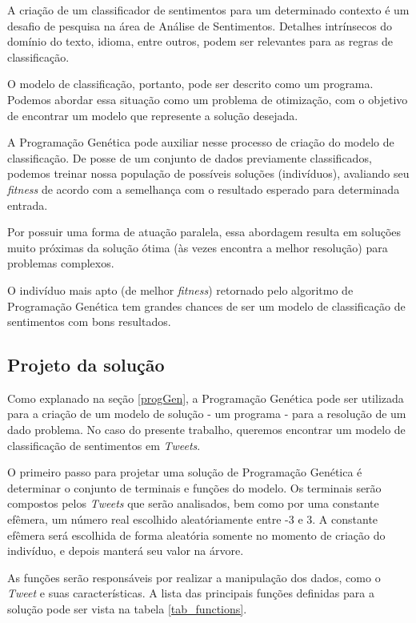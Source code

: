 \documentclass[12pt]{article}
\begin{document}
A criação de um classificador de sentimentos para um determinado contexto é um desafio de pesquisa na área de Análise de Sentimentos. Detalhes intrínsecos do domínio do texto, idioma, entre outros, podem ser relevantes para as regras de classificação. 

O modelo de classificação, portanto, pode ser descrito como um programa. Podemos abordar essa situação como um problema de otimização, com o objetivo de encontrar um modelo que represente a solução desejada.

A Programação Genética pode auxiliar nesse processo de criação do modelo de classificação. De posse de um conjunto de dados previamente classificados, podemos treinar nossa população de possíveis soluções (indivíduos), avaliando seu \emph{fitness} de acordo com a semelhança com o resultado esperado para determinada entrada.

Por possuir uma forma de atuação paralela, essa abordagem resulta em soluções muito próximas da solução ótima (às vezes encontra a melhor resolução) para problemas complexos.

O indivíduo mais apto (de melhor \emph{fitness}) retornado pelo algoritmo de Programação Genética tem grandes chances de ser um modelo de classificação de sentimentos com bons resultados.

\subsection{Projeto da solução}

Como explanado na seção \ref{progGen}, a Programação Genética pode ser utilizada para a criação de um modelo de solução - um programa - para a resolução de um dado problema. No caso do presente trabalho, queremos encontrar um modelo de classificação de sentimentos em \emph{Tweets}.

O primeiro passo para projetar uma solução de Programação Genética é determinar o conjunto de terminais e funções do modelo. Os terminais serão compostos pelos \emph{Tweets} que serão analisados, bem como por uma constante efêmera, um número real escolhido aleatóriamente entre -3 e 3. A constante efêmera será escolhida de forma aleatória somente no momento de criação do indivíduo, e depois manterá seu valor na árvore.

As funções serão responsáveis por realizar a manipulação dos dados, como o \emph{Tweet} e suas características. A lista das principais funções definidas para a solução pode ser vista na tabela \ref{tab_functions}.
\end{document}
